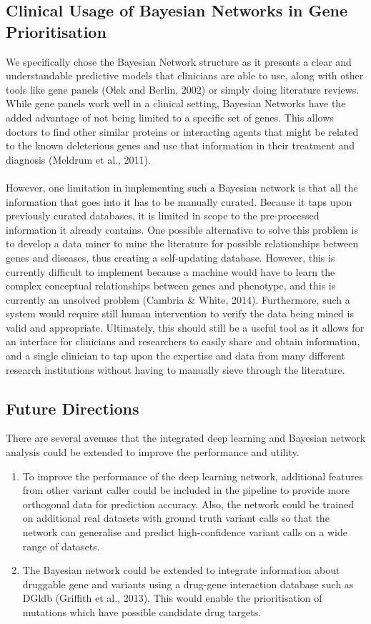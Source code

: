\documentclass{article}
\begin{document}
\subsection{Clinical Usage of Bayesian Networks in Gene Prioritisation}
We specifically chose the Bayesian Network structure as it presents a clear and understandable predictive models that clinicians are able to use, along with other tools like gene panels (Olek and Berlin, 2002) or simply doing literature reviews. 
While gene panels work well in a clinical setting, Bayesian Networks have the added advantage of not being limited to a specific set of genes. This allows doctors to find other similar proteins or interacting agents that might be related to the known deleterious genes and use that information in their treatment and diagnosis (Meldrum et al., 2011).\\\\
However, one limitation in implementing such a Bayesian network is that all the information that goes into it has to be manually curated. Because it taps upon previously curated databases, it is limited in scope to the pre-processed information it already contains. One possible alternative to solve this problem is to develop a data miner to mine the literature for possible relationships between genes and diseases, thus creating a self-updating database. However, this is currently difficult to implement because a machine would have to learn the complex conceptual relationships between genes and phenotype, and this is currently an unsolved problem (Cambria \& White, 2014). Furthermore, such a system would require still human intervention to verify the data being mined is valid and appropriate. Ultimately, this should still be a useful tool as it allows for an interface for clinicians and researchers to easily share and obtain information, and a single clinician to tap upon the expertise and data from many different research institutions without having to manually sieve through the literature. 

\subsection{Future Directions}
There are several avenues that the integrated deep learning and Bayesian network analysis could be extended to improve the performance and utility.
\begin{enumerate}
    \item To improve the performance of the deep learning network, additional features from other variant caller could be included in the pipeline to provide more orthogonal data for prediction accuracy. Also, the network could be trained on additional real datasets with ground truth variant calls so that the network can generalise and predict high-confidence variant calls on a wide range of datasets.
    \item The Bayesian network could be extended to integrate information about druggable gene and variants using a drug-gene interaction database such as DGldb (Griffith et al., 2013). This would enable the prioritisation of mutations which have possible candidate drug targets. 
\end{enumerate}
\end{document}
